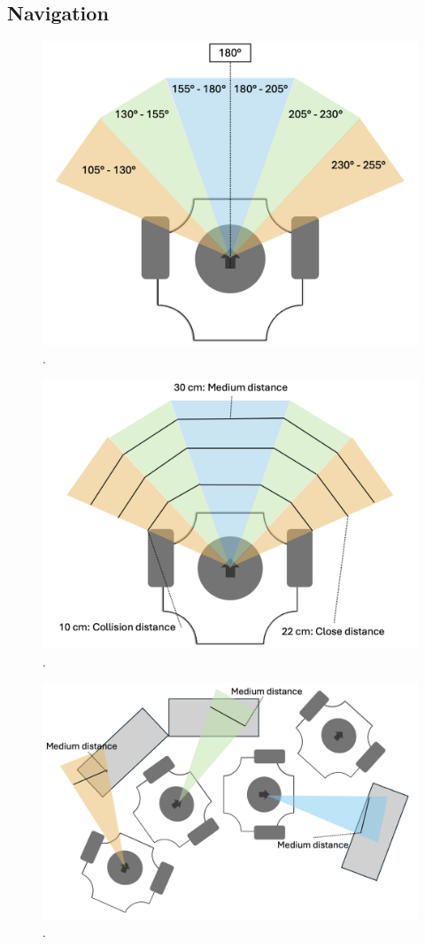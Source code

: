 \documentclass[conference]{IEEEtran}
\begin{document}
\subsection{Navigation}
\begin{figure}[htbp]
    \centerline{\includegraphics[width=0.9\columnwidth]{LiDAR Angels.png}}
    \caption{.}
    \label{sec:angles}
    \end{figure}
\begin{figure}[htbp]
    \centerline{\includegraphics[width=0.9\columnwidth]{LiDAR Distances.png}}
    \caption{.}
    \label{sec:distances}
    \end{figure}
\begin{figure}[htbp]
    \centerline{\includegraphics[width=0.9\columnwidth]{Medium Distance Aviodance.png}}
    \caption{.}
    \label{sec:medium aviodance}
    \end{figure}
\end{document}
